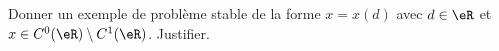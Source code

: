 
\begin{exercice}\label{exoSerieUn0002}

Donner un exemple de problème stable de la forme  $x=x(d)$ avec $d\in\eR$ et $x \in C^0(\eR)\setminus C^1(\eR)$. Justifier.

\end{exercice}
